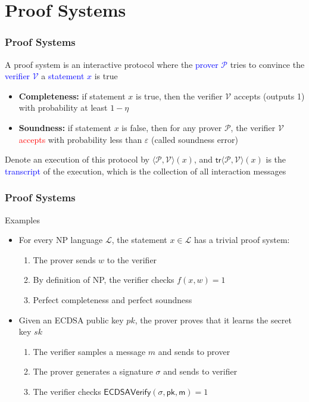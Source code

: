 \documentclass{beamer}
\newcommand{\blue}[1]{\textcolor{blue}{#1}}
\newcommand{\dgreen}[1]{\textcolor{dgreen}{#1}}
\newcommand{\red}[1]{\textcolor{red}{#1}}
\begin{document}
\section{Proof Systems}
\frame
{
  \frametitle{Proof Systems}
  \onslide<+-> A proof system is an interactive protocol where the \blue{prover $\mathcal{P}$} tries to \dgreen{convince} the \blue{verifier $\mathcal{V}$} a \blue{statement $x$} is true
  \begin{itemize}
    \item<+-> \textbf{Completeness:} if statement $x$ is true, then the verifier $\mathcal{V}$ \dgreen{accepts} (outputs 1) with probability at least $1-\eta$
    \item<+-> \textbf{Soundness:} if statement $x$ is false, then for any prover $\mathcal{P}$, the verifier $\mathcal{V}$ \red{accepts} with probability less than $\varepsilon$ (called soundness error)
  \end{itemize}
  \onslide<+-> Denote an execution of this protocol by $\langle\mathcal{P},\mathcal{V}\rangle(x)$, and $\mathsf{tr}\langle\mathcal{P},\mathcal{V}\rangle(x)$ is the \blue{transcript} of the execution, which is the collection of all interaction messages
}

\frame
{
  \frametitle{Proof Systems}
  \onslide<+-> Examples
  \begin{itemize}
    \item<+-> For every NP language $\mathcal{L}$, the statement $x\in\mathcal{L}$ has a trivial proof system:
    \begin{enumerate}
      \item<+-> The prover sends $w$ to the verifier
      \item<+-> By definition of NP, the verifier checks $f(x,w)=1$
      \item<+-> \dgreen{Perfect completeness} and \dgreen{perfect soundness}
    \end{enumerate}
    \item<+-> Given an ECDSA public key $pk$, the prover proves that it learns the secret key $sk$
    \begin{enumerate}
      \item<+-> The verifier samples a message $m$ and sends to prover
      \item<+-> The prover generates a signature $\sigma$ and sends to verifier
      \item<+-> The verifier checks $\mathsf{ECDSAVerify(\sigma,pk,m)}=1$
    \end{enumerate}
  \end{itemize}
}
\end{document}

